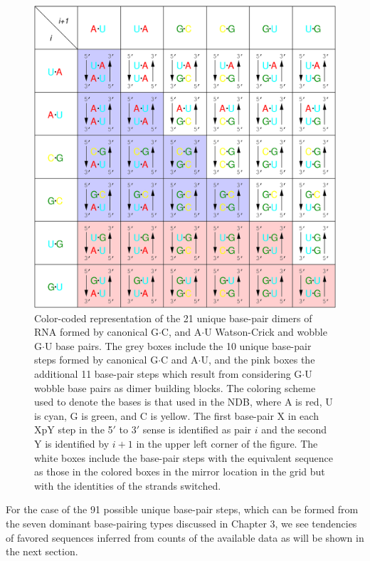 \begin{figure}
\centering
\includegraphics[angle=0, scale=0.4]{Chapter4/unique.png}
\caption{Color-coded representation of  the 21 unique base-pair dimers
  of RNA formed by canonical G$\cdot$C, and A$\cdot$U Watson-Crick and
  wobble G$\cdot$U base  pairs.  The grey boxes include  the 10 unique
  base-pair steps formed by canonical G$\cdot$C and A$\cdot$U, and the
  pink  boxes the  additional  11 base-pair  steps  which result  from
  considering   G$\cdot$U  wobble   base  pairs   as   dimer  building
  blocks. The coloring scheme used to denote the bases is that used in
  the NDB,  where A is red,  U is cyan, G  is green, and  C is yellow.
  The first base-pair X in each XpY  step in the 5$'$ to 3$'$ sense is
  identified as  pair $i$ and the  second Y is identified  by $i+1$ in
  the upper  left corner  of the figure.  The white boxes  include the
  base-pair steps with the equivalent sequence as those in the colored
  boxes in the mirror location in  the grid but with the identities of
  the strands switched.}
\label{fig:unique}
\end{figure}  

For the case  of the 91 possible unique base-pair  steps, which can be
formed from the seven dominant base-pairing types discussed in Chapter
3, we see  tendencies of favored sequences inferred  from counts of the
available data as will be shown in the next section.

